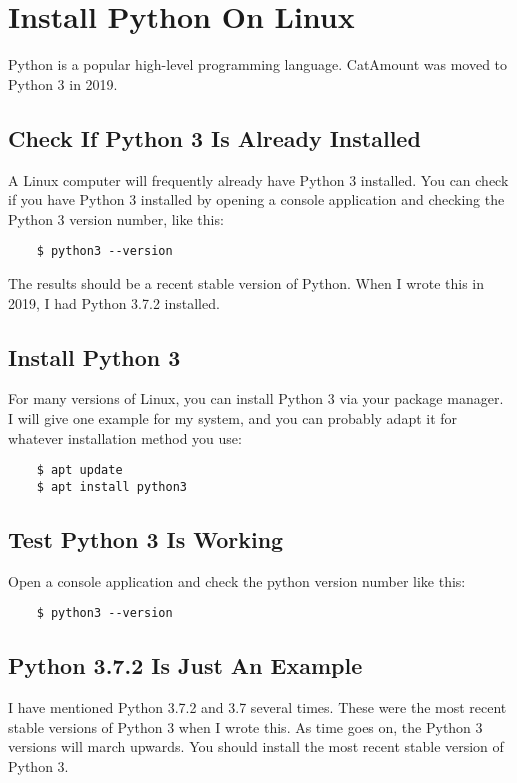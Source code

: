 \chapter{Install Python On Linux}
\hypertarget{linux-install-python}{}

Python is a popular high-level programming language. CatAmount was
moved to Python 3 in 2019.

\section{Check If Python 3 Is Already Installed}

A Linux computer will frequently already have Python 3 installed.
You can check if you have Python 3 installed by opening a console
application and checking the Python 3 version number, like this:

\begin{verbatim}
    $ python3 --version
\end{verbatim}

The results should be a recent stable version of Python. When I wrote
this in 2019, I had Python 3.7.2 installed.

\section{Install Python 3}

For many versions of Linux, you can install Python 3 via your package
manager. I will give one example for my system, and you can probably
adapt it for whatever installation method you use:

\begin{verbatim}
    $ apt update
    $ apt install python3
\end{verbatim}

\section{Test Python 3 Is Working}

Open a console application and check the python version number like this:

\begin{verbatim}
    $ python3 --version
\end{verbatim}

\section{Python 3.7.2 Is Just An Example}

I have mentioned Python 3.7.2 and 3.7 several times. These were the
most recent stable versions of Python 3 when I wrote this. As time
goes on, the Python 3 versions will march upwards. You should install
the most recent stable version of Python 3.
